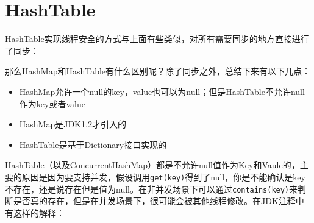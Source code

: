 \documentclass[12pt]{article}
\begin{document}
\begin{Shaded}
\begin{Highlighting}[]
  \OperatorTok{(}\OperatorTok{)} \OperatorTok{\{}
     \OperatorTok{(}\OperatorTok{)} \OperatorTok{\{}\OperatorTok{(}\OperatorTok{);\}}
\OperatorTok{\}}
\OperatorTok{(}\OperatorTok{)} \OperatorTok{\{}
     \OperatorTok{(}\OperatorTok{)} \OperatorTok{\{}\OperatorTok{(}\OperatorTok{);\}}
\OperatorTok{\}}
\end{Highlighting}
\end{Shaded}

\section{HashTable}\label{hashtable}

HashTable实现线程安全的方式与上面有些类似，对所有需要同步的地方直接进行了同步：

\begin{Shaded}
\begin{Highlighting}[]
   \OperatorTok{()} \OperatorTok{\{}
    \OperatorTok{;}
\OperatorTok{\}}
\end{Highlighting}
\end{Shaded}

那么HashMap和HashTable有什么区别呢？除了同步之外，总结下来有以下几点：

\begin{itemize}
\tightlist
\item
  HashMap允许一个null的key，value也可以为null；但是HashTable不允许null作为key或者value
\item
  HashMap是JDK1.2才引入的
\item
  HashTable是基于Dictionary接口实现的
\end{itemize}

HashTable（以及ConcurrentHashMap）都是不允许null值作为Key和Vaule的，主要的原因是因为要支持并发，假设调用\texttt{get(key)}得到了null，你是不能确认是key不存在，还是说存在但是值为null。在非并发场景下可以通过\texttt{contains(key)}来判断是否真的存在，但是在并发场景下，很可能会被其他线程修改。在JDK注释中有这样的解释：
\end{document}
